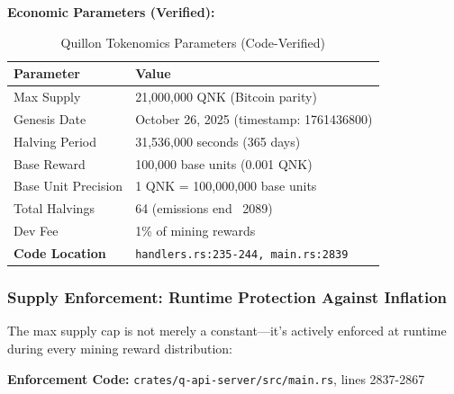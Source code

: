 \documentclass[11pt,a4paper]{article}
\begin{document}
\textbf{Economic Parameters (Verified):}

\begin{table}[h]
\centering
\begin{tabular}{@{}ll@{}}
\toprule
\textbf{Parameter} & \textbf{Value} \\ \midrule
Max Supply & 21,000,000 QNK (Bitcoin parity) \\
Genesis Date & October 26, 2025 (timestamp: 1761436800) \\
Halving Period & 31,536,000 seconds (365 days) \\
Base Reward & 100,000 base units (0.001 QNK) \\
Base Unit Precision & 1 QNK = 100,000,000 base units \\
Total Halvings & 64 (emissions end ~2089) \\
Dev Fee & 1\% of mining rewards \\
\textbf{Code Location} & \texttt{handlers.rs:235-244, main.rs:2839} \\ \bottomrule
\end{tabular}
\caption{Quillon Tokenomics Parameters (Code-Verified)}
\end{table}

\subsubsection{Supply Enforcement: Runtime Protection Against Inflation}

The max supply cap is not merely a constant—it's actively enforced at runtime during every mining reward distribution:

\textbf{Enforcement Code:} \texttt{crates/q-api-server/src/main.rs}, lines 2837-2867
\end{document}
